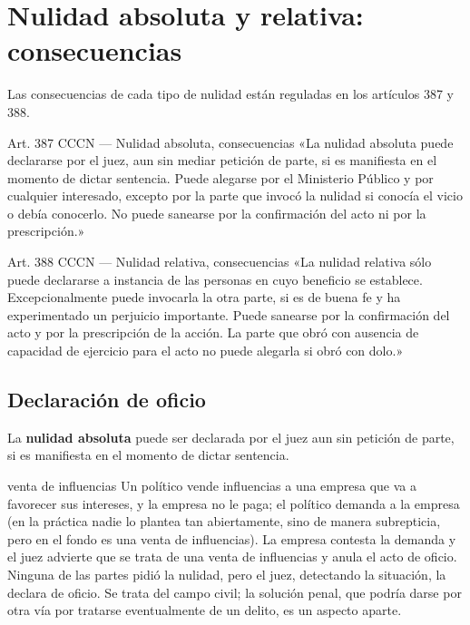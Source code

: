 \documentclass[12pt,oneside]{book}
\begin{document}
\section{Nulidad absoluta y relativa: consecuencias}

Las consecuencias de cada tipo de nulidad están reguladas en los artículos 387 y 388.

\begin{articulo}{Art. 387 CCCN --- Nulidad absoluta, consecuencias}
«La nulidad absoluta puede declararse por el juez, aun sin mediar petición de parte, si es manifiesta en el momento de dictar sentencia. Puede alegarse por el Ministerio Público y por cualquier interesado, excepto por la parte que invocó la nulidad si conocía el vicio o debía conocerlo. No puede sanearse por la confirmación del acto ni por la prescripción.»
\end{articulo}

\begin{articulo}{Art. 388 CCCN --- Nulidad relativa, consecuencias}
«La nulidad relativa sólo puede declararse a instancia de las personas en cuyo beneficio se establece. Excepcionalmente puede invocarla la otra parte, si es de buena fe y ha experimentado un perjuicio importante. Puede sanearse por la confirmación del acto y por la prescripción de la acción. La parte que obró con ausencia de capacidad de ejercicio para el acto no puede alegarla si obró con dolo.»
\end{articulo}

\subsection{Declaración de oficio}

La \textbf{nulidad absoluta} puede ser declarada por el juez aun sin petición de parte, si es manifiesta en el momento de dictar sentencia.

\begin{example}{venta de influencias}
Un político vende influencias a una empresa que va a favorecer sus intereses, y la empresa no le paga; el político demanda a la empresa (en la práctica nadie lo plantea tan abiertamente, sino de manera subrepticia, pero en el fondo es una venta de influencias). La empresa contesta la demanda y el juez advierte que se trata de una venta de influencias y anula el acto de oficio. Ninguna de las partes pidió la nulidad, pero el juez, detectando la situación, la declara de oficio. Se trata del campo civil; la solución penal, que podría darse por otra vía por tratarse eventualmente de un delito, es un aspecto aparte.
\end{example}
\end{document}
